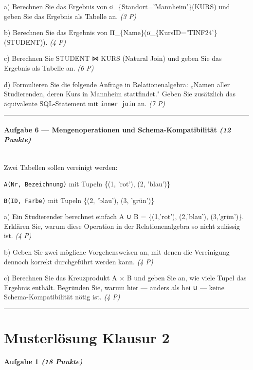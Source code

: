 \documentclass[11pt, a4paper]{article}
\begin{document}
a) Berechnen Sie das Ergebnis von σ\_\{Standort='Mannheim'\}(KURS) und geben Sie das Ergebnis als Tabelle an. \textit{(3 P)}


b) Berechnen Sie das Ergebnis von Π\_\{Name\}(σ\_\{KursID='TINF24'\}(STUDENT)). \textit{(4 P)}


c) Berechnen Sie STUDENT ⋈ KURS (Natural Join) und geben Sie das Ergebnis als Tabelle an. \textit{(6 P)}


d) Formulieren Sie die folgende Anfrage in Relationenalgebra: „Namen aller Studierenden, deren Kurs in Mannheim stattfindet." Geben Sie zusätzlich das äquivalente SQL-Statement mit \texttt{inner join} an. \textit{(7 P)}



\noindent\textcolor{rulegray}{\rule{\linewidth}{0.4pt}}


\paragraph{Aufgabe 6 — Mengenoperationen und Schema-Kompatibilität \textit{(12 Punkte)}}\mbox{}\\[2pt]

Zwei Tabellen sollen vereinigt werden:


\texttt{A(Nr, Bezeichnung)} mit Tupeln \{(1, 'rot'), (2, 'blau')\}

\texttt{B(ID, Farbe)} mit Tupeln \{(2, 'blau'), (3, 'grün')\}


a) Ein Studierender berechnet einfach A ∪ B = \{(1,'rot'), (2,'blau'), (3,'grün')\}. Erklären Sie, warum diese Operation in der Relationenalgebra so nicht zulässig ist. \textit{(4 P)}


b) Geben Sie zwei mögliche Vorgehensweisen an, mit denen die Vereinigung dennoch korrekt durchgeführt werden kann. \textit{(4 P)}


c) Berechnen Sie das Kreuzprodukt A × B und geben Sie an, wie viele Tupel das Ergebnis enthält. Begründen Sie, warum hier — anders als bei ∪ — keine Schema-Kompatibilität nötig ist. \textit{(4 P)}



\noindent\textcolor{rulegray}{\rule{\linewidth}{0.4pt}}



\section{Musterlösung Klausur 2}

\paragraph{Aufgabe 1 \textit{(18 Punkte)}}\mbox{}\\[2pt]
\end{document}
